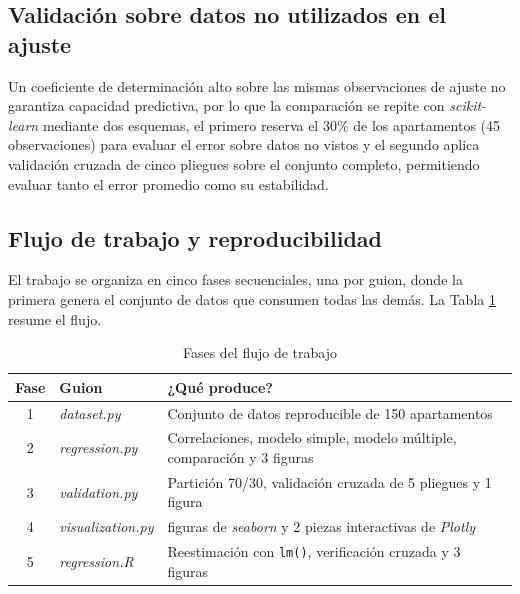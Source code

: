     \subsection{Validación sobre datos no utilizados en el ajuste}
        Un coeficiente de determinación alto sobre las mismas observaciones de
        ajuste no garantiza capacidad predictiva, por lo que la comparación se
        repite con \textit{scikit-learn} mediante dos
        esquemas, el primero reserva el 30\% de los apartamentos (45
        observaciones) para evaluar el error sobre datos no vistos y el segundo
        aplica validación cruzada de cinco pliegues sobre el conjunto completo,
        permitiendo evaluar tanto el error promedio como su estabilidad.

    \subsection{Flujo de trabajo y reproducibilidad}
        El trabajo se organiza en cinco fases secuenciales, una por guion, donde la
        primera genera el conjunto de datos que consumen todas las demás. La Tabla
        \ref{workflow} resume el flujo.

        \begin{table}[H]
            \centering
            \caption{Fases del flujo de trabajo}
            \begin{center}
                \begin{tabular}{|c|l|>{\raggedright\arraybackslash}p{3.7cm}|}
                    \hline
                    \textbf{Fase} & \textbf{Guion} & \textbf{¿Qué produce?} \\
                    \hline
                    1 & \textit{dataset.py} & Conjunto de datos reproducible de 150
                    apartamentos \\
                    \hline
                    2 & \textit{regression.py} & Correlaciones, modelo simple,
                    modelo múltiple, comparación y 3 figuras \\
                    \hline
                    3 & \textit{validation.py} & Partición 70/30, validación cruzada
                    de 5 pliegues y 1 figura \\
                    \hline
                    4 & \textit{visualization.py} & 3 figuras de \textit{seaborn} y
                    2 piezas interactivas de \textit{Plotly} \\
                    \hline
                    5 & \textit{regression.R} & Reestimación con \texttt{lm()},
                    verificación cruzada y 3 figuras \\
                    \hline
                \end{tabular}
                \label{workflow}
            \end{center}
        \end{table}

